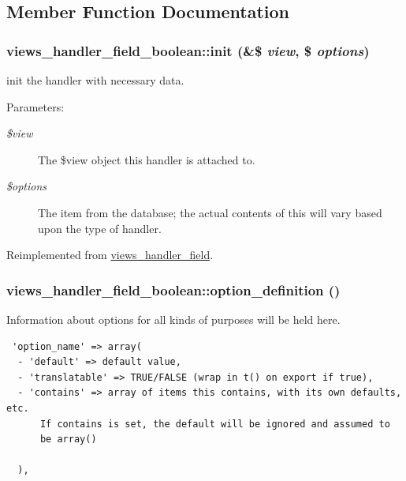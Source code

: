 \subsection{Member Function Documentation}
\hypertarget{classviews__handler__field__boolean_0150fb8a25c2f1f2537d476b1c448238}{
\subsubsection[{init}]{\setlength{\rightskip}{0pt plus 5cm}views\_\-handler\_\-field\_\-boolean::init (\&\$ {\em view}, \/  \$ {\em options})}}
\label{classviews__handler__field__boolean_0150fb8a25c2f1f2537d476b1c448238}


init the handler with necessary data. \begin{Desc}
\item[Parameters:]
\begin{description}
\item[{\em \$view}]The \$view object this handler is attached to. \item[{\em \$options}]The item from the database; the actual contents of this will vary based upon the type of handler. \end{description}
\end{Desc}


Reimplemented from \hyperlink{classviews__handler__field_7eaaf0fd6fbc57c2955f88b257394d19}{views\_\-handler\_\-field}.\hypertarget{classviews__handler__field__boolean_53f8c9215cddcfb3cab33f742a1e6c52}{
\subsubsection[{option\_\-definition}]{\setlength{\rightskip}{0pt plus 5cm}views\_\-handler\_\-field\_\-boolean::option\_\-definition ()}}
\label{classviews__handler__field__boolean_53f8c9215cddcfb3cab33f742a1e6c52}


Information about options for all kinds of purposes will be held here. 

\begin{Code}\begin{verbatim} 'option_name' => array(
  - 'default' => default value,
  - 'translatable' => TRUE/FALSE (wrap in t() on export if true),
  - 'contains' => array of items this contains, with its own defaults, etc.
      If contains is set, the default will be ignored and assumed to
      be array()

  ),
\end{verbatim}
\end{Code}

